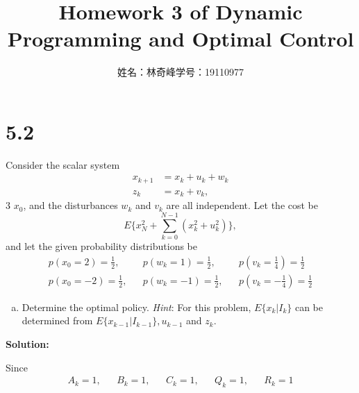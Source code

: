 \documentclass{article}
\begin{document}
    \title{Homework 3 of Dynamic Programming and Optimal Control}
    \author{姓名：林奇峰\qquad 学号：19110977}
    \maketitle

    \section{5.2}
    Consider the scalar system
        \begin{equation*}
            \begin{aligned}
                x_{k+1}&=x_k+u_k+w_k\\
                z_k &= x_k +v_k,
            \end{aligned}
        \end{equation*}
   3 $x_0$, and the disturbances $w_k$ and $v_k$ are all independent. Let the cost be 
    \begin{equation*}
        E\bigg\{x^2_N+\sum_{k=0}^{N-1}(x_k^2+u_k^2)\bigg\},
    \end{equation*}
    and let the given probability distributions be
    \begin{equation*}
        \begin{aligned}
            p(x_0=2)=\frac{1}{2},&&p(w_k=1)=\frac{1}{2}, &&p(v_k=\frac{1}{4})=\frac{1}{2}\\
            p(x_0=-2)=\frac{1}{2},&&p(w_k=-1)=\frac{1}{2}, &&p(v_k=-\frac{1}{4})=\frac{1}{2}
        \end{aligned}
    \end{equation*}
    \begin{enumerate}[(a)]
        \item Determine the optimal policy. \textit{Hint}: For this problem, $E\{x_k|I_k\}$ can be determined from $E\{x_{k-1}|I_{k-1}\},u_{k-1}$ and $z_k$.
    \end{enumerate}
    \textbf{Solution:}

    Since
    \begin{equation*}
        \begin{aligned}
            A_k = 1, && B_k=1, && C_k=1, &&Q_k=1, && R_k=1
        \end{aligned}
    \end{equation*}
    
\end{document}
